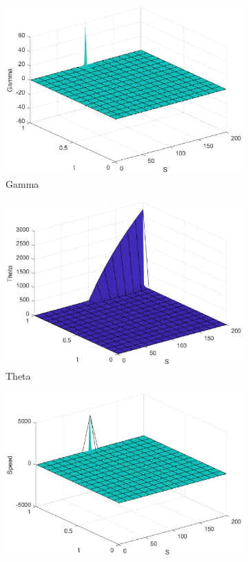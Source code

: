 \begin{figure}[H]
\begin{subfigure}[b]{0.35\linewidth}
        \includegraphics[width=\linewidth]{Imagenes/6_Sols/Binary_Call/Binary_Call_Gamma.eps}
        \caption{Gamma}
    \end{subfigure}
    \begin{subfigure}[b]{0.35\linewidth}
        \includegraphics[width=\linewidth]{Imagenes/6_Sols/Binary_Call/Binary_Call_Theta.eps}
        \caption{Theta}
    \end{subfigure}
    \begin{subfigure}[b]{0.35\linewidth}
        \includegraphics[width=\linewidth]{Imagenes/6_Sols/Binary_Call/Binary_Call_Speed.eps}

\end{subfigure}
\end{figure}
